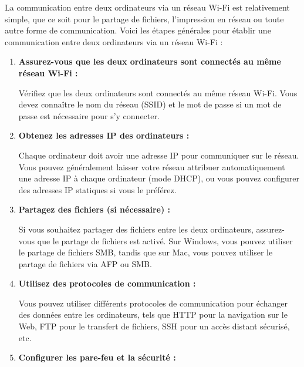 
%


La communication entre deux ordinateurs via un réseau Wi-Fi est relativement simple, que ce soit pour le partage de fichiers, l'impression en réseau ou toute autre forme de communication. Voici les étapes générales pour établir une communication entre deux ordinateurs via un réseau Wi-Fi :

\begin{enumerate}
    \item \textbf{Assurez-vous que les deux ordinateurs sont connectés au même réseau Wi-Fi :}
    
    Vérifiez que les deux ordinateurs sont connectés au même réseau Wi-Fi. Vous devez connaître le nom du réseau (SSID) et le mot de passe si un mot de passe est nécessaire pour s'y connecter.
    
    \item \textbf{Obtenez les adresses IP des ordinateurs :}
    
    Chaque ordinateur doit avoir une adresse IP pour communiquer sur le réseau. Vous pouvez généralement laisser votre réseau attribuer automatiquement une adresse IP à chaque ordinateur (mode DHCP), ou vous pouvez configurer des adresses IP statiques si vous le préférez.
    
    \item \textbf{Partagez des fichiers (si nécessaire) :}
    
    Si vous souhaitez partager des fichiers entre les deux ordinateurs, assurez-vous que le partage de fichiers est activé. Sur Windows, vous pouvez utiliser le partage de fichiers SMB, tandis que sur Mac, vous pouvez utiliser le partage de fichiers via AFP ou SMB.
    
    \item \textbf{Utilisez des protocoles de communication :}
    
    Vous pouvez utiliser différents protocoles de communication pour échanger des données entre les ordinateurs, tels que HTTP pour la navigation sur le Web, FTP pour le transfert de fichiers, SSH pour un accès distant sécurisé, etc.
    
    \item \textbf{Configurer les pare-feu et la sécurité :}
    

\end{enumerate}
